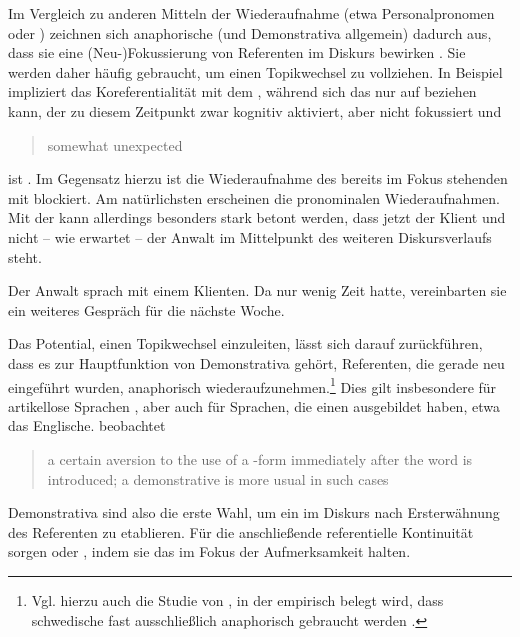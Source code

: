 Im Vergleich zu anderen Mitteln der Wiederaufnahme   (etwa Personalpronomen oder ) zeichnen sich anaphorische   (und Demonstrativa  allgemein) dadurch aus, dass sie eine (Neu-)Fokussierung von Referenten im Diskurs bewirken \parencite [s. u.a.][]{Ehlich1979,Prince1981,Gundel1993,Comrie1997,Himmelmann1996,Diessel1999,Kibrik2011}. Sie werden daher häufig gebraucht, um einen Topikwechsel  zu vollziehen. In Beispiel  \parencite[angelehnt an][96]{Diessel1999} impliziert das   Koreferentialität  mit dem  , während sich das   nur auf  beziehen kann, der zu diesem Zeitpunkt zwar kognitiv aktiviert, aber nicht fokussiert und \blockcquote[96]{Diessel1999}{somewhat unexpected} ist \parencite[vgl. hierzu][278--279]{Gundel1993}. Im Gegensatz hierzu ist die Wiederaufnahme des bereits im Fokus stehenden  mit  blockiert. Am natürlichsten erscheinen die pronominalen  Wiederaufnahmen. Mit der   kann allerdings besonders stark betont werden, dass jetzt der Klient und nicht -- wie erwartet -- der Anwalt im Mittelpunkt des weiteren Diskursverlaufs steht.   

\begin{exe}
	\ex \label{ex:topic} Der Anwalt sprach mit einem Klienten. Da  nur wenig Zeit hatte, vereinbarten sie ein weiteres Gespräch für die nächste Woche. 
\end{exe}

Das Potential, einen Topikwechsel  einzuleiten, lässt sich darauf zurückführen, dass es zur Hauptfunktion von Demonstrativa  gehört, Referenten, die gerade neu eingeführt wurden, anaphorisch  wiederaufzunehmen.\footnote{Vgl. hierzu auch die Studie von \citeauthor{Fraurud1990}, in der empirisch belegt wird, dass schwedische  fast ausschließlich anaphorisch  gebraucht werden \parencite[400]{Fraurud1990}.} Dies gilt insbesondere für artikellose Sprachen  \parencite[229]{Himmelmann1996}, aber auch für Sprachen, die einen  ausgebildet haben, etwa das Englische. \citeauthor{Christophersen1939} beobachtet \blockcquote[vgl.][29]{Christophersen1939} {a certain aversion to the use of a -form immediately after the word is introduced; a demonstrative is more usual in such cases}. Demonstrativa  sind also die erste Wahl, um ein  im Diskurs nach Ersterwähnung des Referenten zu etablieren. Für die  anschließende referentielle Kontinuität  sorgen  oder , indem sie das  im Fokus der Aufmerksamkeit halten.\largerpage[-3]

